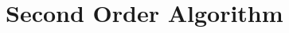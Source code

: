 \documentclass{beamer}
\begin{document}
%
%
%
%
%
%

\section{Second Order Algorithm}
%
%
\end{document}
